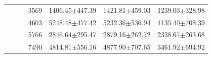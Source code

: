\begin{table}[t]
\begin{tabular}{ccccccc}
                              &                       &                                 & 3569        & 1406.45$\pm$447.39                                                             & 1421.81$\pm$459.03                                                         & 1239.03$\pm$328.98                                                         \\
                              &                       &                                 & 4603        & 5248.48$\pm$477.42                                                             & 5232.36$\pm$536.94                                                         & 4135.40$\pm$708.39                                                         \\
                              &                       &                                 & 5766        & 2846.64$\pm$295.47                                                             & 2879.16$\pm$262.72                                                         & 2338.67$\pm$263.68                                                         \\
                              &                       &                                 & 7490        & 4814.81$\pm$556.16                                                             & 4877.90$\pm$707.65                                                         & 3461.92$\pm$694.92                                                         \\
        \bottomrule
    \end{tabular}

\end{table}
